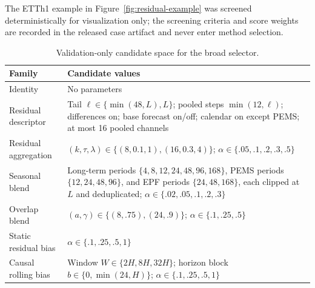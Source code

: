 The ETTh1 example in Figure~\ref{fig:residual-example} was screened
deterministically for visualization only; the screening criteria and score
weights are recorded in the released case artifact and never enter method
selection.

\begin{table}[h]
\centering
\small
\caption{Validation-only candidate space for the broad selector.}
\label{tab:search-space}
\begin{tabular}{p{}p{}}
\toprule
Family & Candidate values\\
\midrule
Identity & No parameters\\
Residual descriptor & Tail $\ell\in\{\min(48,L),L\}$; pooled steps
$\min(12,\ell)$; differences on; base forecast on/off; calendar on except PEMS;
at most 16 pooled channels\\
Residual aggregation &
$(k,\tau,\lambda)\in\{(8,0.1,1),(16,0.3,4)\}$;
$\alpha\in\{.05,.1,.2,.3,.5\}$\\
Seasonal blend & Long-term periods $\{4,8,12,24,48,96,168\}$, PEMS periods
$\{12,24,48,96\}$, and EPF periods $\{24,48,168\}$, each clipped at $L$ and
deduplicated; $\alpha\in\{.02,.05,.1,.2,.3\}$\\
Overlap blend & $(a,\gamma)\in\{(8,.75),(24,.9)\}$;
$\alpha\in\{.1,.25,.5\}$\\
Static residual bias & $\alpha\in\{.1,.25,.5,1\}$\\
Causal rolling bias & Window $W\in\{2H,8H,32H\}$; horizon block
$b\in\{0,\min(24,H)\}$; $\alpha\in\{.1,.25,.5,1\}$\\
\bottomrule
\end{tabular}
\end{table}

